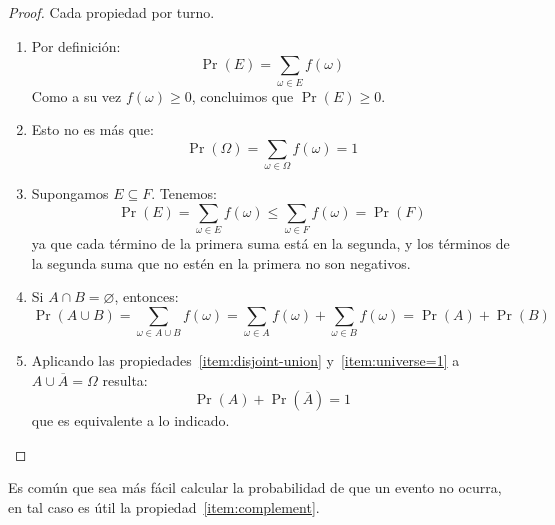   \begin{proof}
    Cada propiedad por turno.
    \begin{enumerate}
    \item
      Por definición:
      \begin{equation*}
	\Pr(E)
	  = \sum_{\omega \in E} f(\omega)
      \end{equation*}
      Como a su vez \(f(\omega) \ge 0\),
      concluimos que \(\Pr(E) \ge 0\).
    \item
      Esto no es más que:
      \begin{equation*}
	\Pr(\Omega)
	  = \sum_{\omega \in \Omega} f(\omega)
	  = 1
      \end{equation*}
    \item
      Supongamos \(E \subseteq F\).
      Tenemos:
      \begin{equation*}
	\Pr(E)
	  =   \sum_{\omega \in E} f(\omega)
	  \le \sum_{\omega \in F} f(\omega)
	  =   \Pr(F)
      \end{equation*}
      ya que cada término de la primera suma está en la segunda,
      y los términos de la segunda suma que no estén en la primera
      no son negativos.
    \item
      Si \(A \cap B = \varnothing\),
      entonces:
      \begin{equation*}
	\Pr(A \cup B)
	  = \sum_{\omega \in A \cup B} f(\omega)
	  = \sum_{\omega \in A} f(\omega)
	     + \sum_{\omega \in B} f(\omega)
	  = \Pr(A)+ \Pr(B)
      \end{equation*}
    \item
      Aplicando las propiedades~\ref{item:disjoint-union}
      y~\ref{item:universe=1} a \(A \cup \overline{A} = \Omega\)
      resulta:
      \begin{equation*}
	\Pr(A) + \Pr(\overline{A})
	 = 1
      \end{equation*}
      que es equivalente a lo indicado.
    \qedhere
    \end{enumerate}
  \end{proof}
  Es común que sea más fácil calcular
  la probabilidad de que un evento no ocurra,
  en tal caso es útil la propiedad~\ref{item:complement}.

